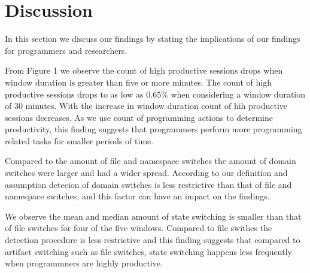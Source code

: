 \section{Discussion}
In this section we discuss our findings by stating the implications of our findings for programmers and researchers.  


\begin{itemize}
\begin{item}
From Figure 1 we observe the count of high productive sessions drops when window duration is greater than five or more minutes. The count of high productive sessions drops to as low as 0.65\%
when considering a window duration of 30 minutes. With the increase in window duration count of hih productive sessions decreases. As we use count of programming actions to determine productivity, this finding suggests that 
programmers perform more programming related tasks for smaller periods of time. 

     
\end{item}

\begin{item}
Compared to the amount of file and namespace switches the amount of 
domain switches were larger and had a wider spread. According to our definition and assumption detecion of domain switches is less restrictive 
than that of file and namespace switches, and this factor can have an impact on the findings. 

We observe the mean and median amount of state switching is smaller than that of file switches for four of the five windows. Compared to file swithes the detection procedure is less restrictive and this finding suggests that compared to artifact switching such as file switches, state switching happens less frequently when programmners are highly productive.  

     

\end{item}
\end{itemize}
